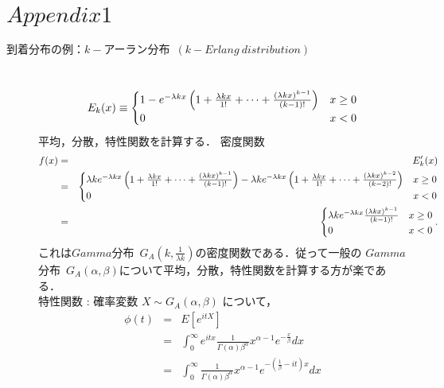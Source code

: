 \documentclass[a4j,papersize,disablejfam,slide,14pt]{jsarticle}
\def\exp#1{\mbox{$ e^{#1} $}} %
\begin{document}
\section{$Appendix1$}
	\begin{description}
    	\item[到着分布の例：$k-$アーラン分布\ $(k-Erlang\ distribution)$]\mbox{}\\
    		\begin{equation}
    			E_k(x) \equiv
        		\begin{cases}
        			1 - \exp{-\lambda k x} \left( 1 + \frac{\lambda k x}{1!} + \cdots + \frac{(\lambda k x)^{k-1}}{(k-1)!} \right) & \text{$x \geq 0$}\\
    				0 & \text{$x < 0$}
        		\end{cases}
    		\end{equation}
        平均，分散，特性関数を計算する．
        密度関数
        \begin{eqnarray}
            f(x) &=& E_k'(x) \\&=& 
            \begin{cases}
        			\lambda k \exp{-\lambda k x} \left( 1 + \frac{\lambda k x}{1!} + \cdots + \frac{(\lambda k x)^{k-1}}{(k-1)!} \right)
                    - \lambda k \exp{-\lambda k x} \left( 1 + \frac{\lambda k x}{1!} + \cdots + \frac{(\lambda k x)^{k-2}}{(k-2)!} \right) & \text{$x \geq 0$}\\
    				0 & \text{$x < 0$}
        	\end{cases} 
            \\&=&
            \begin{cases}
        			\lambda k \exp{-\lambda k x} \frac{(\lambda k x)^{k-1}}{(k-1)!} & \text{$x \geq 0$}\\
    				0 & \text{$x < 0$}
        	\end{cases}.
        \end{eqnarray}
        これは$Gamma$分布\ $G_A(k, \frac{1}{\lambda k})$の密度関数である．従って一般の
        $Gamma$分布\ $G_A(\alpha, \beta)$について平均，分散，特性関数を計算する方が楽である．\\
        特性関数 : 確率変数 $X \sim G_A(\alpha, \beta)$ について，
        \begin{eqnarray}
			\phi(t) &=& E[e^{itX}] \\
			&=& \int_{0}^{\infty} e^{itx} \frac{1}{\Gamma(\alpha)\beta^\alpha} x^{\alpha-1} e^{-\frac{x}{\beta}} dx \\
			&=& \int_{0}^{\infty} \frac{1}{\Gamma(\alpha)\beta^\alpha} x^{\alpha-1} e^{-(\frac{1}{\beta}-it)x} dx	\\

\end{eqnarray}
\end{description}
\end{document}
